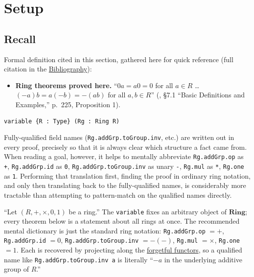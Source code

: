 \section{Setup}\label{sec:09-ring-theorems:01-setup:1}

\subsection{Recall}\label{sec:09-ring-theorems:01-setup:2}

Formal definition cited in this section, gathered here for quick reference (full citation in the \hyperref[sec:root:bibliography:1]{Bibliography}):

\begin{itemize}
\tightlist
\item
  \textbf{Ring theorems proved here.} ``\(0a = a0 = 0\) for all \(a \in R\) \ldots{} \((-a)b = a(-b) = -(ab)\) for all \(a, b \in R\)'' (\cite{DummitFoote2003}, §7.1 ``Basic Definitions and Examples,'' p.~225, Proposition 1).
\end{itemize}

\begin{lstlisting}
variable {R : Type} (Rg : Ring R)
\end{lstlisting}

Fully-qualified field names (\texttt{Rg.addGrp.toGroup.inv}, etc.) are written out in every proof, precisely so that it is always clear which structure a fact came from. When reading a goal, however, it helps to mentally abbreviate \texttt{Rg.addGrp.op} as \texttt{+}, \texttt{Rg.addGrp.id} as \texttt{0}, \texttt{Rg.addGrp.toGroup.inv} as unary \texttt{-\allowbreak{}}, \texttt{Rg.mul} as \texttt{*}, \texttt{Rg.one} as \texttt{1}. Performing that translation first, finding the proof in ordinary ring notation, and only then translating back to the fully-qualified names, is considerably more tractable than attempting to pattern-match on the qualified names directly.

\begin{mathreading}

``Let \((R, +, \times, 0, 1)\) be a ring.'' The \texttt{variable} fixes an arbitrary object of \(\mathbf{Ring}\); every theorem below is a statement about all rings at once. The recommended mental dictionary is just the standard ring notation: \texttt{Rg.addGrp.op} \(= +\), \texttt{Rg.addGrp.id} \(= 0\), \texttt{Rg.addGrp.toGroup.inv} \(= -(-)\), \texttt{Rg.mul} \(= \times\), \texttt{Rg.one} \(= 1\). Each is recovered by projecting along the \hyperref[sec:01-basics:04-terminology:1]{forgetful functors}, so a qualified name like \texttt{Rg.addGrp.toGroup.inv a} is literally ``\(-a\) in the underlying additive group of \(R\).''

\end{mathreading}

